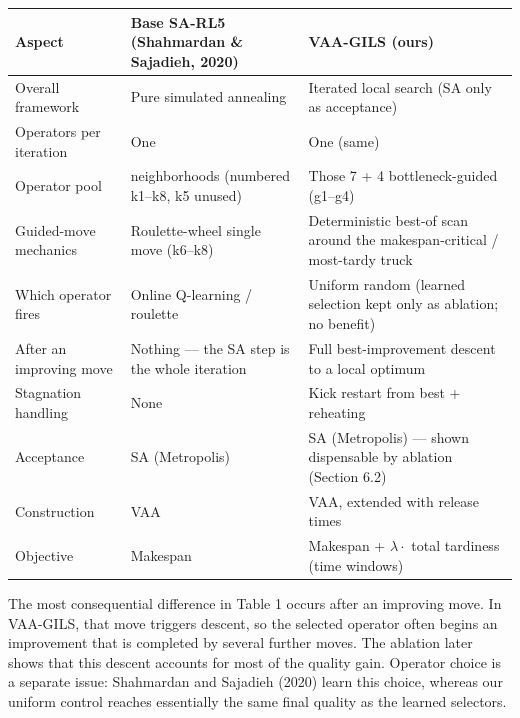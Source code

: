 \documentclass[
]{article}
\newcounter{none} %
\begin{document}
{\def\LTcaptype{none} %
\begin{longtable}[]{@{}
  >{\raggedright\arraybackslash}p{}
  >{\raggedright\arraybackslash}p{}
  >{\raggedright\arraybackslash}p{}@{}}
\toprule\noalign{}
\begin{minipage}[b]{\linewidth}\raggedright
Aspect
\end{minipage} & \begin{minipage}[b]{\linewidth}\raggedright
Base SA-RL5 (Shahmardan \& Sajadieh, 2020)
\end{minipage} & \begin{minipage}[b]{\linewidth}\raggedright
VAA-GILS (ours)
\end{minipage} \\
\midrule\noalign{}
\endhead
\bottomrule\noalign{}
\endlastfoot
Overall framework & Pure simulated annealing & Iterated local search (SA
only as acceptance) \\
Operators per iteration & One & One (same) \\
Operator pool & 7 neighborhoods (numbered k1--k8, k5 unused) & Those 7 +
4 bottleneck-guided (g1--g4) \\
Guided-move mechanics & Roulette-wheel single move (k6--k8) &
Deterministic best-of scan around the makespan-critical / most-tardy
truck \\
Which operator fires & Online Q-learning / roulette & Uniform random
(learned selection kept only as ablation; no benefit) \\
After an improving move & Nothing --- the SA step is the whole iteration
& Full best-improvement descent to a local optimum \\
Stagnation handling & None & Kick restart from best + reheating \\
Acceptance & SA (Metropolis) & SA (Metropolis) --- shown dispensable by
ablation (Section 6.2) \\
Construction & VAA & VAA, extended with release times \\
Objective & Makespan & Makespan + \(\lambda\cdot\) total tardiness (time
windows) \\
\end{longtable}
}

The most consequential difference in Table 1 occurs after an improving
move. In VAA-GILS, that move triggers descent, so the selected operator
often begins an improvement that is completed by several further moves.
The ablation later shows that this descent accounts for most of the
quality gain. Operator choice is a separate issue: Shahmardan and
Sajadieh (2020) learn this choice, whereas our uniform control reaches
essentially the same final quality as the learned selectors.
\end{document}
